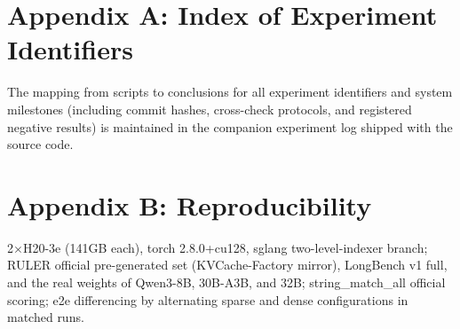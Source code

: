 \documentclass[11pt]{article}
\begin{document}
\section*{Appendix A: Index of Experiment Identifiers}
The mapping from scripts to conclusions for all experiment identifiers and system milestones (including commit hashes, cross-check protocols, and registered negative results) is maintained in the companion experiment log shipped with the source code.

\section*{Appendix B: Reproducibility}
2$\times$H20-3e (141GB each), torch 2.8.0+cu128, sglang two-level-indexer branch; RULER official pre-generated set (KVCache-Factory mirror), LongBench v1 full, and the real weights of Qwen3-8B, 30B-A3B, and 32B; string\_match\_all official scoring; e2e differencing by alternating sparse and dense configurations in matched runs.
\end{document}
